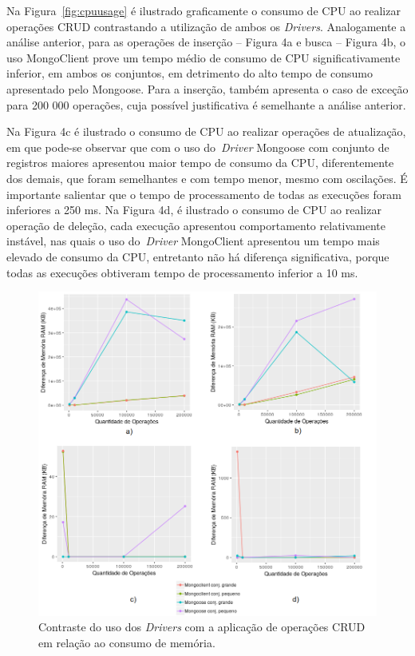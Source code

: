 \documentclass[12pt]{article}
\begin{document}
Na Figura~\ref{fig:cpuusage} é ilustrado graficamente o consumo de CPU ao realizar operações CRUD contrastando a utilização de ambos os \emph{Drivers}.
Analogamente a análise anterior, para as operações de inserção -- Figura 4a e busca -- Figura 4b, o uso MongoClient prove um tempo médio de consumo de CPU significativamente inferior, em ambos os conjuntos, em detrimento do alto tempo de consumo apresentado pelo Mongoose. Para a inserção, também apresenta o caso de exceção para 200 000 operações, cuja possível justificativa é semelhante a análise anterior.

Na Figura 4c é ilustrado o consumo de CPU ao realizar operações de atualização, em que pode-se observar que com o uso do~\emph{Driver} Mongoose com conjunto de registros maiores apresentou maior tempo de consumo da CPU, diferentemente dos demais, que foram semelhantes e com tempo menor, mesmo com oscilações. 
É importante salientar que o tempo de processamento de todas as execuções foram inferiores a 250 ms.
Na Figura 4d, é ilustrado o consumo de CPU ao realizar operação de deleção, cada execução apresentou comportamento relativamente instável, nas quais o uso do~\emph{Driver} MongoClient apresentou um tempo mais elevado de consumo da CPU, entretanto não há diferença significativa, porque todas as execuções obtiveram tempo de processamento inferior a 10 ms.

\begin{figure}[!ht]
    \centering
    \includegraphics[width=\textwidth]{images/memory}
	 \caption{Contraste do uso dos \emph{Drivers} com a aplicação de operações CRUD em relação ao consumo de memória.}
    \label{fig:memory}
\end{figure}
\end{document}
